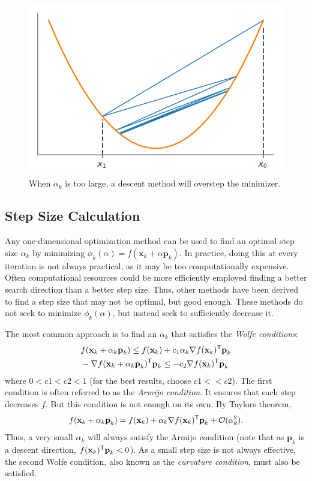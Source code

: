 \begin{figure}[H]
\centering
\includegraphics[width=.7\textwidth]{figures/large_alpha.pdf}
\caption{When $\alpha_k$ is too large, a descent method will overstep the minimizer. }
\label{fig:alpha}
\end{figure}

\subsection*{Step Size Calculation} %

Any one-dimensional optimization method can be used to find an optimal step size $\alpha_k$ by minimizing $\phi_k(\alpha) =  f(\textbf{x}_k + \alpha\textbf{p}_k)$.
In practice, doing this at every iteration is not always practical, as it may be too computationally expensive.
Often computational resources could be more efficiently employed finding a better search direction than a better step size.
Thus, other methods have been derived to find a step size that may not be optimal, but good enough.
These methods do not seek to minimize $\phi_k(\alpha)$, but instead seek to sufficiently decrease it.

The most common approach is to find an $\alpha_k$ that satisfies the \emph{Wolfe conditions}:
\begin{align*}
&f(\textbf{x}_k + \alpha_k \textbf{p}_k) \leq f(\textbf{x}_k) + c_1\alpha_k\nabla f(\textbf{x}_k)^{\mathsf T} \textbf{p}_k  \\
& -\nabla f(\textbf{x}_k + \alpha_k \textbf{p}_k)^{\mathsf T} \textbf{p}_k \leq -c_2\nabla f(\textbf{x}_k)^{\mathsf T} \textbf{p}_k
\end{align*}
where $0 < c1 < c2 < 1$ (for the  best results, choose $c1 << c2$).
The first condition is often referred to as the \emph{Armijo condition}.
It ensures that each step decreases $f$.
But this condition is not enough on its own.
By Taylors theorem,
$$f(\textbf{x}_k + \alpha_k \textbf{p}_k) = f(\textbf{x}_k) + \alpha_k\nabla f(\textbf{x}_k)^{\mathsf T} \textbf{p}_k + \mathcal{O}(\alpha_k^2).$$
Thus, a very small $\alpha_k$ will always satisfy the Armijo condition (note that as $\textbf{p}_k$ is a descent direction, $f(\textbf{x}_k)^{\mathsf T}\textbf{p}_k < 0$).
As a small step size is not always effective, the second Wolfe condition, also known as the \emph{curvature condition}, must also be satisfied.

